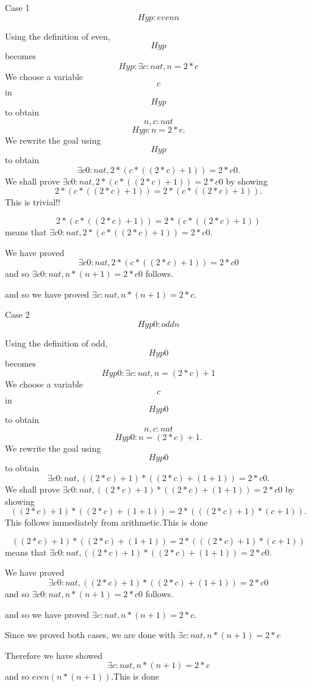 \documentclass[11pt, oneside]{article}
\begin{document}
 Case 1 $$Hyp : even n $$

 Using the definition of even, $$Hyp $$ becomes $$Hyp : \exists c : nat, n = 2 * c $$ We choose a variable $$c$$ in $$Hyp $$ to obtain $$n, c : nat $$ $$Hyp : n = 2 * c .$$ We rewrite the goal using $$Hyp $$ to obtain $$\exists c0 : nat, 2 * (c * ((2 * c) + 1)) = 2 * c0 .$$We shall prove $\exists c0 : nat, 2 * (c * ((2 * c) + 1)) = 2 * c0 $ by showing $$2 * (c * ((2 * c) + 1)) = 2 * (c * ((2 * c) + 1)) .$${\color{red}This is trivial!!}

 $$2 * (c * ((2 * c) + 1)) = 2 * (c * ((2 * c) + 1)) $$ means that $\exists c0 : nat, 2 * (c * ((2 * c) + 1)) = 2 * c0 $.

 We have proved $$\exists c0 : nat, 2 * (c * ((2 * c) + 1)) = 2 * c0 $$ and so $\exists c0 : nat, n * (n + 1) = 2 * c0 $ follows.

 and so we have proved $\exists c : nat, n * (n + 1) = 2 * c $.

 

 Case 2 $$Hyp0 : odd n $$

 Using the definition of odd, $$Hyp0 $$ becomes $$Hyp0 : \exists c : nat, n = (2 * c) + 1 $$ We choose a variable $$c$$ in $$Hyp0 $$ to obtain $$n, c : nat $$ $$Hyp0 : n = (2 * c) + 1 .$$ We rewrite the goal using $$Hyp0 $$ to obtain $$\exists c0 : nat, ((2 * c) + 1) * ((2 * c) + (1 + 1)) = 2 * c0 .$$We shall prove $\exists c0 : nat, ((2 * c) + 1) * ((2 * c) + (1 + 1)) = 2 * c0 $ by showing $$((2 * c) + 1) * ((2 * c) + (1 + 1)) = 2 * (((2 * c) + 1) * (c + 1)) .$$This follows immediately from arithmetic.This is done

 $$((2 * c) + 1) * ((2 * c) + (1 + 1)) = 2 * (((2 * c) + 1) * (c + 1)) $$ means that $\exists c0 : nat, ((2 * c) + 1) * ((2 * c) + (1 + 1)) = 2 * c0 $.

 We have proved $$\exists c0 : nat, ((2 * c) + 1) * ((2 * c) + (1 + 1)) = 2 * c0 $$ and so $\exists c0 : nat, n * (n + 1) = 2 * c0 $ follows.

 and so we have proved $\exists c : nat, n * (n + 1) = 2 * c $.

 Since we proved both cases, we are done with $\exists c : nat, n * (n + 1) = 2 * c $

 Therefore we have showed $$\exists c : nat, n * (n + 1) = 2 * c $$ and so $even (n * (n + 1)) $.This is done
\end{document}
